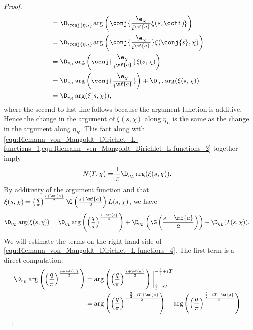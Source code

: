 \begin{proof}
\begin{align*}
          &= \D_{\conj{\eta_{R}}}\arg\left(\conj{\frac{\e_{\chi}}{i^{\mf{a}}}\xi(s,\cchi)}\right) \\
          &= \D_{\conj{\eta_{R}}}\arg\left(\conj{\frac{\e_{\chi}}{i^{\mf{a}}}}\xi(\conj{s},\chi)\right) \\
          &= \D_{\eta_{R}}\arg\left(\conj{\frac{\e_{\chi}}{i^{\mf{a}}}}\xi(s,\chi)\right) \\
          &= \D_{\eta_{R}}\arg\left(\conj{\frac{\e_{\chi}}{i^{\mf{a}}}}\right)+\D_{\eta_{R}}\arg(\xi(s,\chi)) \\
          &= \D_{\eta_{R}}\arg(\xi(s,\chi)),
        \end{align*}
        where the second to last line follows because the argument function is additive. Hence the change in the argument of $\xi(s,\chi)$ along $\eta_{L}$ is the same as the change in the argument along $\eta_{R}$. This fact along with \cref{equ:Riemann_von_Mangoldt_Dirichlet_L-functions_1,equ:Riemann_von_Mangoldt_Dirichlet_L-functions_2} together imply
        \begin{equation}\label{equ:Riemann_von_Mangoldt_Dirichlet_L-functions_3}
          N(T,\chi) = \frac{1}{\pi}\D_{\eta_{L}}\arg(\xi(s,\chi)).
        \end{equation}
        By additivity of the argument function and that $\xi(s,\chi) = \left(\frac{q}{\pi}\right)^{\frac{s+\mf{a}}{2}}\G\left(\frac{s+\mf{a}}{2}\right)L(s,\chi)$, we have
        \begin{equation}\label{equ:Riemann_von_Mangoldt_Dirichlet_L-functions_4}
          \D_{\eta_{L}}\arg(\xi(s,\chi)) = \D_{\eta_{L}}\arg\left(\left(\frac{q}{\pi}\right)^{\frac{s+\mf{a}}{2}}\right)+\D_{\eta_{L}}\left(\G\left(\frac{s+\mf{a}}{2}\right)\right)+\D_{\eta_{L}}(L(s,\chi)).
        \end{equation}
        We will estimate the terms on the right-hand side of \cref{equ:Riemann_von_Mangoldt_Dirichlet_L-functions_4}. The first term is a direct computation:
        \begin{equation}\label{equ:Riemann_von_Mangoldt_Dirichlet_L-function_5}
          \begin{aligned}
            \D_{\eta_{L}}\arg\left(\left(\frac{q}{\pi}\right)^{\frac{s+\mf{a}}{2}}\right) &= \arg\left(\left(\frac{q}{\pi}\right)^{\frac{s+\mf{a}}{2}}\right)\bigg|_{\frac{5}{2}-iT}^{-\frac{3}{2}+iT} \\
            &= \arg\left(\left(\frac{q}{\pi}\right)^{\frac{-\frac{3}{2}+iT+\mf{a}}{2}}\right)-\arg\left(\left(\frac{q}{\pi}\right)^{\frac{\frac{5}{2}-iT+\mf{a}}{2}}\right) \\

\end{aligned}
\end{equation}
\end{proof}
